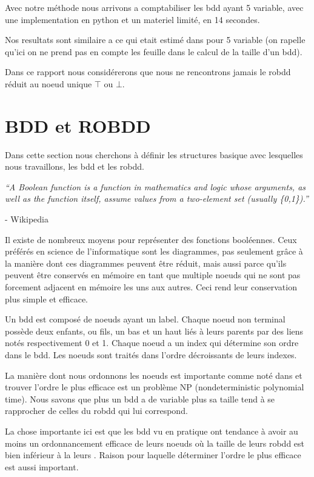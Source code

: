 \documentclass[french]{article}
\begin{document}
Avec notre méthode nous arrivons a comptabiliser les bdd ayant 5 variable, avec une implementation en python et un materiel limité, en 14 secondes.

Nos resultats sont similaire a ce qui etait estimé dans \cite{newton} pour 5 variable (on rapelle qu'ici on ne prend pas en compte les feuille dans le calcul de la taille d'un bdd).

Dans ce rapport nous considérerons que nous ne rencontrons jamais le robdd réduit au noeud unique \(\top\) ou \(\bot.\)
\newpage
\section{BDD et ROBDD}
Dans cette section nous cherchons à définir les structures basique avec lesquelles nous travaillons, les bdd et les robdd.

\begin{center}
\emph{“A Boolean function is a function in mathematics and logic whose arguments, as well as the function itself, assume values from a two-element set (usually \{0,1\}).”} 
\end{center}

- Wikipedia 
\vspace{5mm} %

Il existe de nombreux moyens pour représenter des fonctions booléennes. Ceux préférés en science de l'informatique sont les diagrammes, pas seulement grâce à la manière dont ces diagrammes peuvent être réduit, mais aussi parce qu'ils peuvent être conservés en mémoire en tant que multiple noeuds qui ne sont pas forcement adjacent en mémoire les uns aux autres. Ceci rend leur conservation plus simple et efficace.

Un bdd est composé de noeuds ayant un label. Chaque noeud non terminal possède deux enfants, ou fils, un bas et un haut liés à leurs parents par des liens notés respectivement 0 et 1. Chaque noeud a un index qui détermine son ordre dans le bdd. Les noeuds sont traités dans l'ordre décroissants de leurs indexes.

La manière dont nous ordonnons les noeuds est importante comme noté dans \cite{newton} et trouver l'ordre le plus efficace est un problème NP (nondeterministic polynomial time). Nous savons que plus un bdd a de variable plus sa taille tend à se rapprocher de celles du robdd qui lui correspond.

La chose importante ici est que les bdd vu en pratique ont tendance à avoir au moins un ordonnancement efficace de leurs noeuds où la taille de leurs robdd est bien inférieur à la leurs \cite{gropl}. Raison pour laquelle déterminer l'ordre le plus efficace est aussi important.
\end{document}
